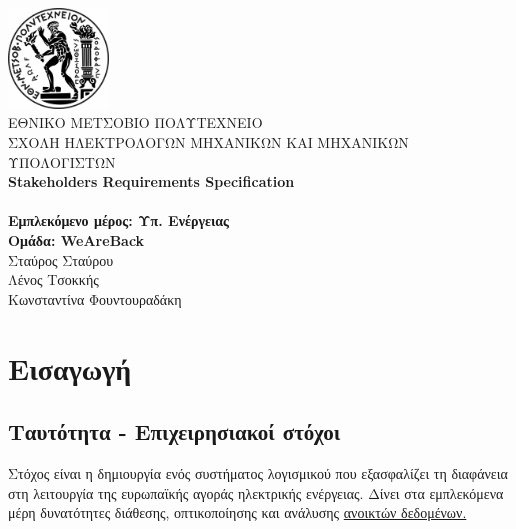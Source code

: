 \documentclass[a4paper,12pt, oneside]{article}
\begin{document}
\begin{titlepage}
\begin{center}

\includegraphics[width=0.20\textwidth]{./img/NTUAlogo.jpg}~\\[0.1cm]
\textsc{ ΕΘΝΙΚΟ ΜΕΤΣΟΒΙΟ ΠΟΛΥΤΕΧΝΕΙΟ}\\[0.2cm]  
\textsc{ ΣΧΟΛΗ ΗΛΕΚΤΡΟΛΟΓΩΝ ΜΗΧΑΝΙΚΩΝ ΚΑΙ ΜΗΧΑΝΙΚΩΝ ΥΠΟΛΟΓΙΣΤΩΝ}\\[3cm] 


\textbf{\LARGE \textlatin{Stakeholders Requirements Specification}}\\[0.01cm]
\\[2cm]

\textbf{\Large Εμπλεκόμενο μέρος: Υπ. Ενέργειας}\\[2cm]

\textbf{Ομάδα:  \textlatin{WeAreBack}}\\
	Σταύρος Σταύρου \\
	Λένος Τσοκκής \\ 
	Κωνσταντίνα Φουντουραδάκη
\vfill

\end{center} 
\end{titlepage}

\thispagestyle{empty}
\newpage

\thispagestyle{empty}
\setcounter{page}{2}
\tableofcontents
\newpage


\section{Εισαγωγή}
\subsection{Ταυτότητα - Επιχειρησιακοί στόχοι}
Στόχος είναι η δημιουργία ενός συστήματος λογισμικού που εξασφαλίζει τη διαφάνεια στη λειτουργία της ευρωπαϊκής αγοράς ηλεκτρικής ενέργειας. Δίνει στα εμπλεκόμενα μέρη δυνατότητες διάθεσης, οπτικοποίησης και ανάλυσης \href{https://transparency.entsoe.eu}{ανοικτών δεδομένων.}
\end{document}
